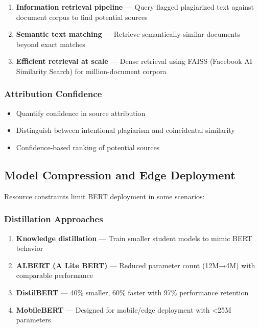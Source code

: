 \begin{enumerate}
  \item \textbf{Information retrieval pipeline} --- Query flagged plagiarized text against document corpus to find potential sources
  \item \textbf{Semantic text matching} --- Retrieve semantically similar documents beyond exact matches
  \item \textbf{Efficient retrieval at scale} --- Dense retrieval using FAISS (Facebook AI Similarity Search) for million-document corpora
\end{enumerate}

\subsubsection{Attribution Confidence}

\begin{itemize}
  \item Quantify confidence in source attribution
  \item Distinguish between intentional plagiarism and coincidental similarity
  \item Confidence-based ranking of potential sources
\end{itemize}

\subsection{Model Compression and Edge Deployment}

Resource constraints limit BERT deployment in some scenarios:

\subsubsection{Distillation Approaches}

\begin{enumerate}
  \item \textbf{Knowledge distillation} --- Train smaller student models to mimic BERT behavior
  \item \textbf{ALBERT (A Lite BERT)} --- Reduced parameter count (12M→4M) with comparable performance
  \item \textbf{DistilBERT} --- 40\% smaller, 60\% faster with 97\% performance retention
  \item \textbf{MobileBERT} --- Designed for mobile/edge deployment with <25M parameters
\end{enumerate}

